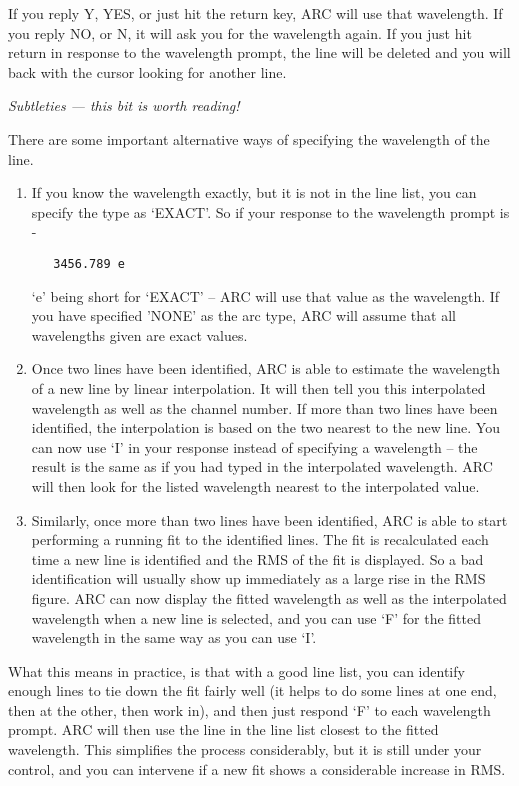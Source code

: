 If you reply Y, YES, or just hit the return key, ARC will use that
wavelength.  If you reply NO, or N, it will ask you for the wavelength
again.  If you just hit return in response to the wavelength prompt, the
line will be deleted and you will back with the cursor looking for another
line.


\goodbreak
\vspace{12pt}
{\it Subtleties --- this bit is worth reading!}

There are some important alternative ways of specifying the
wavelength of the line.

\begin{enumerate}
\item If you know the wavelength exactly, but it is not in the line
   list, you can specify the type as `EXACT'.  So if your response to
   the wavelength prompt is -

   \begin{verbatim}
   3456.789 e
   \end{verbatim}

   `e' being short for `EXACT' -- ARC will use that value as the wavelength.
   If you have specified 'NONE' as the arc type, ARC will assume that 
   all wavelengths given are exact values.
\item Once two lines have been identified, ARC is able to estimate the
   wavelength of a new line by linear interpolation.  It will then tell
   you this interpolated wavelength as well as the channel number.  If
   more than two lines have been identified, the interpolation is based
   on the two nearest to the new line.  You can now use `I' in your
   response instead of specifying a wavelength -- the result is the same
   as if you had typed in the interpolated wavelength.  ARC will then
   look for the listed wavelength nearest to the interpolated value.
\item Similarly, once more than two lines have been identified, ARC is
   able to start performing a running fit to the identified lines.  The
   fit is recalculated each time a new line is identified and the RMS of
   the fit is displayed.  So a bad identification will usually show up
   immediately as a large rise in the RMS figure.  ARC can now display
   the fitted wavelength as well as the interpolated wavelength when a
   new line is selected, and you can use `F' for the fitted wavelength
   in the same way as you can use `I'.
\end{enumerate}

What this means in practice, is that with a good line list, you can
identify enough lines to tie down the fit fairly well (it helps to do some
lines at one end, then at the other, then work in), and then just respond
`F' to each wavelength prompt.  ARC will then use the line in the line list
closest to the fitted wavelength.  This simplifies the process considerably,
but it is still under your control, and you can intervene if a new fit
shows a considerable increase in RMS.  



